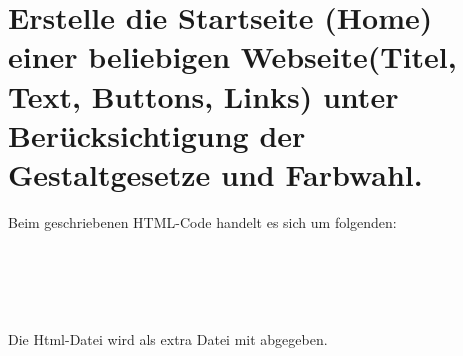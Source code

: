 \documentclass[a4paper,%
twoside,							%
headsepline = true,				%
footsepline = true,				%
headings=normal,
<<<<<<< HEAD
listof=totoc,					%
bibliography=totoc,			%
listof=entryprefix,
=======
listof = totoc,					%
bibliography = totoc,		%
listof = entryprefix,		%
>>>>>>> ff10663913a94aea2786594bebcc3acc7eb1273d
<<<<<<< HEAD
, draft
=======
>>>>>>> ff10663913a94aea2786594bebcc3acc7eb1273d
]
{scrartcl}
\begin{document}
\section{Erstelle die Startseite (Home) einer beliebigen Webseite(Titel, Text, Buttons, Links) unter Berücksichtigung der Gestaltgesetze und Farbwahl.}
\label{sec:AufgabeEins}
Beim geschriebenen HTML-Code handelt es sich um folgenden:
\cite{Hönemann2019:Bewegungswahrnehmung}
\cite[vgl.][2]{Hönemann2019:Farbwahrnehmung} \\
\cites[vgl.][2]{Hönemann2019:Farbwahrnehmung}[10]{Hönemann2019:Bewegungswahrnehmung}[30-40]{Schultz:Gestaltgesetze} \\
\cite{Hönemann2019:Bewegungswahrnehmung} \\
\cite{Schultz:Gestaltgesetze}\\
\cite{GoldsteinE.Bruce2015W:dG}\\
\cites[vgl.][2]{Schultz:Gestaltgesetze}{Hönemann2019:Bewegungswahrnehmung}[][]{GoldsteinE.Bruce2015W:dG}\\
Die Html-Datei wird als extra Datei mit abgegeben.
\end{document}
